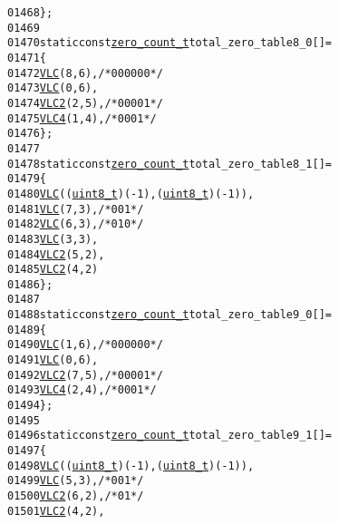 \begin{footnotesize}
\begin{alltt}
01468 \};
01469 
01470 \textcolor{keyword}{static} \textcolor{keyword}{const} \hyperlink{structzero__count__t}{zero_count_t} total\_zero\_table8\_0[] = 
01471 \{
01472         \hyperlink{vlc_8h_a7f3572774a720fd9b4bc3b1a0b65082f}{VLC}(8, 6), \textcolor{comment}{/* 0000 00 */}
01473         \hyperlink{vlc_8h_a7f3572774a720fd9b4bc3b1a0b65082f}{VLC}(0, 6),
01474         \hyperlink{vlc_8h_ad3cda36b9c6132357c7f7de5e52a6c93}{VLC2}(2, 5),\textcolor{comment}{/* 0000 1 */}
01475         \hyperlink{vlc_8h_a02cdc921d8f03450b12879e8afb222cb}{VLC4}(1, 4),\textcolor{comment}{/* 0001 */}
01476 \};
01477 
01478 \textcolor{keyword}{static} \textcolor{keyword}{const} \hyperlink{structzero__count__t}{zero_count_t} total\_zero\_table8\_1[] = 
01479 \{
01480         \hyperlink{vlc_8h_a7f3572774a720fd9b4bc3b1a0b65082f}{VLC}((\hyperlink{_types_8h_a363e4d606232036a6b89060813c45489}{uint8_t})(-1), (\hyperlink{_types_8h_a363e4d606232036a6b89060813c45489}{uint8_t})(-1)),
01481         \hyperlink{vlc_8h_a7f3572774a720fd9b4bc3b1a0b65082f}{VLC}(7, 3), \textcolor{comment}{/* 001 */}
01482         \hyperlink{vlc_8h_a7f3572774a720fd9b4bc3b1a0b65082f}{VLC}(6, 3), \textcolor{comment}{/* 010 */}
01483         \hyperlink{vlc_8h_a7f3572774a720fd9b4bc3b1a0b65082f}{VLC}(3, 3),
01484         \hyperlink{vlc_8h_ad3cda36b9c6132357c7f7de5e52a6c93}{VLC2}(5, 2),
01485         \hyperlink{vlc_8h_ad3cda36b9c6132357c7f7de5e52a6c93}{VLC2}(4, 2)
01486 \};
01487 
01488 \textcolor{keyword}{static} \textcolor{keyword}{const} \hyperlink{structzero__count__t}{zero_count_t} total\_zero\_table9\_0[] = 
01489 \{
01490         \hyperlink{vlc_8h_a7f3572774a720fd9b4bc3b1a0b65082f}{VLC}(1, 6), \textcolor{comment}{/* 0000 00 */}
01491         \hyperlink{vlc_8h_a7f3572774a720fd9b4bc3b1a0b65082f}{VLC}(0, 6),
01492         \hyperlink{vlc_8h_ad3cda36b9c6132357c7f7de5e52a6c93}{VLC2}(7, 5),\textcolor{comment}{/* 0000 1 */}
01493         \hyperlink{vlc_8h_a02cdc921d8f03450b12879e8afb222cb}{VLC4}(2, 4),\textcolor{comment}{/* 0001 */}
01494 \};
01495 
01496 \textcolor{keyword}{static} \textcolor{keyword}{const} \hyperlink{structzero__count__t}{zero_count_t} total\_zero\_table9\_1[] = 
01497 \{
01498         \hyperlink{vlc_8h_a7f3572774a720fd9b4bc3b1a0b65082f}{VLC}((\hyperlink{_types_8h_a363e4d606232036a6b89060813c45489}{uint8_t})(-1), (\hyperlink{_types_8h_a363e4d606232036a6b89060813c45489}{uint8_t})(-1)),
01499         \hyperlink{vlc_8h_a7f3572774a720fd9b4bc3b1a0b65082f}{VLC}(5, 3), \textcolor{comment}{/* 001 */}
01500         \hyperlink{vlc_8h_ad3cda36b9c6132357c7f7de5e52a6c93}{VLC2}(6, 2), \textcolor{comment}{/* 01 */}
01501         \hyperlink{vlc_8h_ad3cda36b9c6132357c7f7de5e52a6c93}{VLC2}(4, 2),

\end{alltt}
\end{footnotesize}
